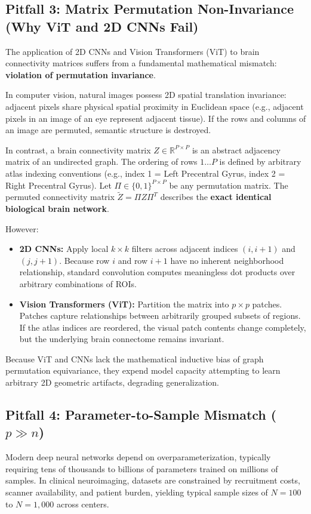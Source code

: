 \documentclass[journal]{IEEEtran}
\begin{document}
\subsection{Pitfall 3: Matrix Permutation Non-Invariance (Why ViT and 2D CNNs Fail)}
The application of 2D CNNs and Vision Transformers (ViT) to brain connectivity matrices suffers from a fundamental mathematical mismatch: \textbf{violation of permutation invariance}.

In computer vision, natural images possess 2D spatial translation invariance: adjacent pixels share physical spatial proximity in Euclidean space (e.g., adjacent pixels in an image of an eye represent adjacent tissue). If the rows and columns of an image are permuted, semantic structure is destroyed.

In contrast, a brain connectivity matrix $Z \in \mathbb{R}^{P \times P}$ is an abstract adjacency matrix of an undirected graph. The ordering of rows $1 \dots P$ is defined by arbitrary atlas indexing conventions (e.g., index 1 = Left Precentral Gyrus, index 2 = Right Precentral Gyrus). 
Let $\Pi \in \{0, 1\}^{P \times P}$ be any permutation matrix. The permuted connectivity matrix $\tilde{Z} = \Pi Z \Pi^T$ describes the \textbf{exact identical biological brain network}.

However:
\begin{itemize}
    \item \textbf{2D CNNs:} Apply local $k \times k$ filters across adjacent indices $(i, i+1)$ and $(j, j+1)$. Because row $i$ and row $i+1$ have no inherent neighborhood relationship, standard convolution computes meaningless dot products over arbitrary combinations of ROIs.
    \item \textbf{Vision Transformers (ViT):} Partition the matrix into $p \times p$ patches. Patches capture relationships between arbitrarily grouped subsets of regions. If the atlas indices are reordered, the visual patch contents change completely, but the underlying brain connectome remains invariant.
\end{itemize}

Because ViT and CNNs lack the mathematical inductive bias of graph permutation equivariance, they expend model capacity attempting to learn arbitrary 2D geometric artifacts, degrading generalization.

\subsection{Pitfall 4: Parameter-to-Sample Mismatch ($p \gg n$)}
Modern deep neural networks depend on overparameterization, typically requiring tens of thousands to billions of parameters trained on millions of samples. In clinical neuroimaging, datasets are constrained by recruitment costs, scanner availability, and patient burden, yielding typical sample sizes of $N = 100$ to $N = 1,000$ across centers.
\end{document}
